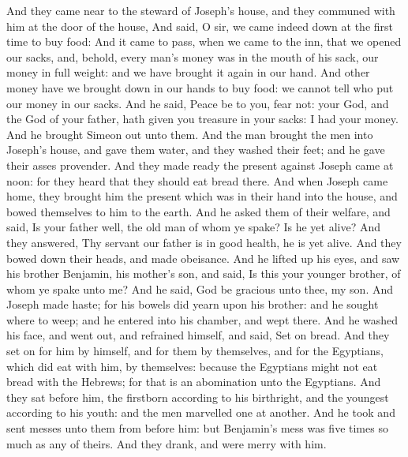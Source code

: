 \begin{biblechapter}
\verse And they came near to the steward of Joseph's house, and they communed with him at the door of the house,
\verse And said, O sir, we came indeed down at the first time to buy food:
\verse And it came to pass, when we came to the inn, that we opened our sacks, and, behold, every man's money was in the mouth of his sack, our money in full weight: and we have brought it again in our hand.
\verse And other money have we brought down in our hands to buy food: we cannot tell who put our money in our sacks.
\verse And he said, Peace be to you, fear not: your God, and the God of your father, hath given you treasure in your sacks: I had your money. And he brought Simeon out unto them.
\verse And the man brought the men into Joseph's house, and gave them water, and they washed their feet; and he gave their asses provender.
\verse And they made ready the present against Joseph came at noon: for they heard that they should eat bread there.
\verse And when Joseph came home, they brought him the present which was in their hand into the house, and bowed themselves to him to the earth.
\verse And he asked them of their welfare, and said, Is your father well, the old man of whom ye spake? Is he yet alive?
\verse And they answered, Thy servant our father is in good health, he is yet alive. And they bowed down their heads, and made obeisance.
\verse And he lifted up his eyes, and saw his brother Benjamin, his mother's son, and said, Is this your younger brother, of whom ye spake unto me? And he said, God be gracious unto thee, my son.
\verse And Joseph made haste; for his bowels did yearn upon his brother: and he sought where to weep; and he entered into his chamber, and wept there.
\verse And he washed his face, and went out, and refrained himself, and said, Set on bread.
\verse And they set on for him by himself, and for them by themselves, and for the Egyptians, which did eat with him, by themselves: because the Egyptians might not eat bread with the Hebrews; for that is an abomination unto the Egyptians.
\verse And they sat before him, the firstborn according to his birthright, and the youngest according to his youth: and the men marvelled one at another.
\verse And he took and sent messes unto them from before him: but Benjamin's mess was five times so much as any of theirs. And they drank, and were merry with him.
\end{biblechapter}


